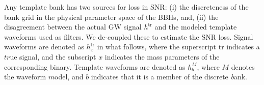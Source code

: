 \documentclass[aps,
prd,
twocolumn,
superscriptaddress,
lengthcheck,showpacs,letterpaper,nofootinbib,
floatfix]{revtex4-1}
\newcommand{\M}{\mathit{M}}
\newcommand{\tr}{\mathrm{tr}}
\newcommand{\Olap}{\mathcal{O}}
\newcommand{\FF}{\mathrm{FF}}
\newcommand{\MM}{\mathrm{MM}}
\newcommand{\red}{\textcolor{red}}
\begin{document}
Any template bank has two sources for loss in SNR: 
(i) the discreteness of the bank grid in the physical parameter space of the 
BBHs, and, (ii) the disagreement between the actual GW signal $h^{\tr}$ and the 
modeled template waveforms used as filters. We de-coupled these to estimate
the SNR loss. Signal waveforms are denoted as $h^\tr_x$ in what follows, 
where the superscript $\tr$ indicates a $tr$ue signal, and the subscript
$x$ indicates the mass parameters of the corresponding binary. Template
waveforms are denoted as $h^\M_b$, where $\M$ denotes the waveform $m$odel, and
$b$ indicates that it is a member of the discrete \textit{b}ank.
\end{document}
